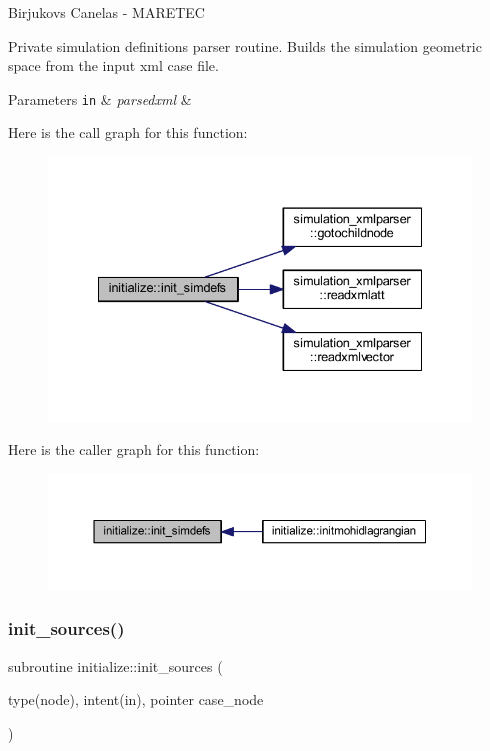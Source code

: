 Birjukovs Canelas -\/ M\+A\+R\+E\+T\+EC 

Private simulation definitions parser routine. Builds the simulation geometric space from the input xml case file. 
\begin{DoxyParams}[1]{Parameters}
\mbox{\tt in}  & {\em parsedxml} & \\
\hline
\end{DoxyParams}
Here is the call graph for this function\+:
\nopagebreak
\begin{figure}[H]
\begin{center}
\leavevmode
\includegraphics[width=335pt]{namespaceinitialize_adb972e92da4789506ee6b62b702df2b3_cgraph}
\end{center}
\end{figure}
Here is the caller graph for this function\+:
\nopagebreak
\begin{figure}[H]
\begin{center}
\leavevmode
\includegraphics[width=350pt]{namespaceinitialize_adb972e92da4789506ee6b62b702df2b3_icgraph}
\end{center}
\end{figure}
\mbox{\label{namespaceinitialize_a9ed75476e5dd07928aed3442281930be}} 
\subsubsection{\texorpdfstring{init\+\_\+sources()}{init\_sources()}}
{\footnotesize\ttfamily subroutine initialize\+::init\+\_\+sources (\begin{DoxyParamCaption}\item[{type(node), intent(in), pointer}]{case\+\_\+node }\end{DoxyParamCaption})\hspace{0.3cm}{\ttfamily [private]}}



